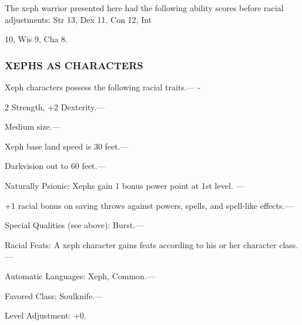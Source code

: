 \documentclass{article}
\begin{document}
The xeph warrior presented here had the following ability scores before racial 
adjustments: Str 13, Dex 11, Con 12, Int

10, Wis 9, Cha 8.

\subsubsection*{XEPHS AS CHARACTERS}

Xeph characters possess the following racial traits.--- -

\parindent=3pt
2 Strength, +2 Dexterity.---

\parindent=0pt
Medium size.---

Xeph base land speed is 30 feet.---

Darkvision out to 60 feet.---

Naturally Psionic: Xephs gain 1 bonus power point at 1st level. --- 

\parindent=3pt
+1 racial bonus on saving throws against powers, spells, and spell-like effects.---

\parindent=0pt
Special Qualities (see above): Burst.---

Racial Feats: A xeph character gains feats according to his or her character class.---

Automatic Languages: Xeph, Common.---

Favored Class: Soulknife.---

Level Adjustment: +0.

\newpage
\end{document}
